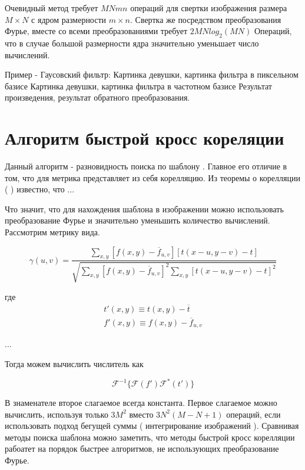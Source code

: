 \documentclass[oneside,final,14pt]{extreport}
\begin{document}
Очевидный метод требует $MNmn$ операций для свертки изображения размера $M\times N$ с ядром размерности $m\times n$. Свертка же посредством преобразования Фурье, вместе со всеми преобразованиями требует $2MNlog_2(MN)$ Операций, что в случае большой размерности ядра значительно уменьшает число вычислений. 

Пример - Гаусовский фильтр:
Картинка девушки, картинка фильтра в пиксельном базисе
Картинка девушки, картинка фильтра в частотном базисе
Результат произведения, результат обратного преобразования.

\section{Алгоритм быстрой  кросс кореляции}
Данный алгоритм  - разновидность поиска по шаблону \cite{Cross-Correlation}. Главное его отличие в том, что для метрика представляет из себя корелляцию. Из теоремы о корелляции (  ) известно, что ...  

Что значит, что для нахождения шаблона в изображении можно использовать преобразование Фурье и значительно уменьшить количество вычислений. 
Рассмотрим метрику вида.

\begin{equation}
\gamma(u,v)
=
\frac{
\sum_{x,y}
[f(x,y) - \overline{f}_{u,v}]
[t(x-u,y-v)-t]
}
{
\sqrt{
\sum_{x,y}
[f(x,y) - \overline{f}_{u,v}]^2
\sum_{x,y}
[t(x-u,y-v)-t]^2
}
} 
\end{equation}

где
\begin{gather*}
t'(x,y)
\equiv
t(x,y) - \overline{t}
\\
f'(x,y)
\equiv
f(x,y) - \overline{f}_{u,v}
\end{gather*}

...

Тогда можем вычислить числитель как

\begin{equation}
\mathcal{F}^{-1}
\{
\mathcal{F}(f')
\mathcal{F}^*(t')
\}
\end{equation}

В знаменателе второе слагаемое всегда константа. Первое слагаемое можно вычислить, используя только $3M^2$   вместо $3N^2(M-N+1)$ операций, если использовать подход бегущей суммы ( интегрирование изображений ). 
Сравнивая методы поиска шаблона можно заметить, что методы быстрой кросс корелляции рабоатет на порядок быстрее алгоритмов, не использующих преобразование Фурье. 
\end{document}
